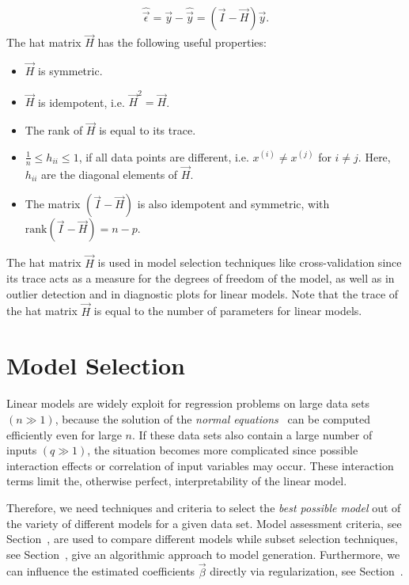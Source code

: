 \begin{align} \label{eq:residal_with_hat_matrix}
	\hat{\vec{\epsilon}} = \vec{y} - \hat{\vec{y}} = (\vec{I} - \vec{H}) \vec{y}.
\end{align}
%
The hat matrix $\vec{H}$ has the following useful properties:

\begin{itemize}
	\item $\vec{H}$ is symmetric.
	\item $\vec{H}$ is idempotent, i.e. $\vec{H}^2 = \vec{H}$.
	\item The rank of $\vec{H}$ is equal to its trace.
 	\item $\frac{1}{n} \le h_{ii} \le 1$, if all data points are different, i.e. $x^{(i)} \ne x^{(j)}$ for $i \ne j$. Here, $h_{ii}$ are the diagonal elements of $\vec{H}$.
	\item The matrix $(\vec{I} - \vec{H})$ is also idempotent and symmetric, with $\mathrm{rank}(\vec{I} - \vec{H}) = n - p$.
\end{itemize}

The hat matrix $\vec{H}$ is used in model selection techniques like cross-validation since its trace acts as a measure for the degrees of freedom of the model, as well as in outlier detection and in diagnostic plots for linear models. Note that the trace of the hat matrix $\vec{H}$ is equal to the number of parameters for linear models. 

\section{Model Selection} \label{sec:ModelSelection}

Linear models are widely exploit for regression problems on large data sets $(n \gg 1)$, because the solution of the \emph{normal equations}~ can be computed efficiently even for large $n$. If these data sets also contain a large number of inputs $(q \gg 1)$, the situation becomes more complicated since possible interaction effects or correlation of input variables may occur. These interaction terms limit the, otherwise perfect, interpretability of the linear model. 

Therefore, we need techniques and criteria to select the \emph{best possible model} out of the variety of different models for a given data set. Model assessment criteria, see Section~, are used to compare different models while subset selection techniques, see Section~, give an algorithmic approach to model generation. Furthermore, we can influence the estimated coefficients $\vec{\beta}$ directly via regularization, see Section~. 

